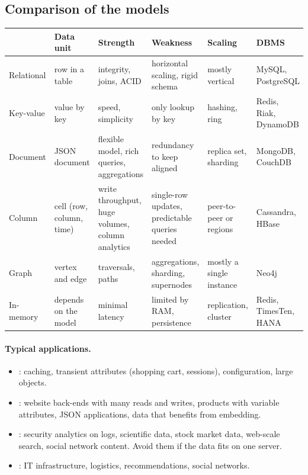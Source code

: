 \subsection{Comparison of the models}
\begin{center}\footnotesize
\begin{tabular}{p{1.65cm}p{2.5cm}p{2.5cm}p{2.5cm}p{2.5cm}p{1.6cm}}
\toprule
& \textbf{Data unit} & \textbf{Strength} & \textbf{Weakness} & \textbf{Scaling} & \textbf{DBMS} \\
\midrule
Relational & row in a table & integrity, joins, ACID & horizontal scaling, rigid schema & mostly vertical & MySQL, PostgreSQL \\
\addlinespace
Key-value & value by key & speed, simplicity & only lookup by key & hashing, ring & Redis, Riak, DynamoDB \\
\addlinespace
Document & JSON document & flexible model, rich queries, aggregations & redundancy to keep aligned & replica set, sharding & MongoDB, CouchDB \\
\addlinespace
Column & cell (row, column, time) & write throughput, huge volumes, column analytics & single-row updates, predictable queries needed & peer-to-peer or regions & Cassandra, HBase \\
\addlinespace
Graph & vertex and edge & traversals, paths & aggregations, sharding, supernodes & mostly a single instance & Neo4j \\
\addlinespace
In-memory & depends on the model & minimal latency & limited by RAM, persistence & replication, cluster & Redis, TimesTen, HANA \\
\bottomrule
\end{tabular}
\end{center}

\paragraph{Typical applications.}
\begin{itemize}
  \item {}: caching, transient attributes (shopping cart, sessions), configuration, large objects.
  \item {}: website back-ends with many reads and writes, products with variable attributes, JSON applications, data that benefits from embedding.
  \item {}: security analytics on logs, scientific data, stock market data, web-scale search, social network content. Avoid them if the data fits on one server.
  \item {}: IT infrastructure, logistics, recommendations, social networks.
\end{itemize}

